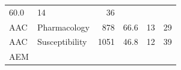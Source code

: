 \documentclass[11pt,]{article}
\begin{document}
\begin{longtable}[]{@{}llrrrr@{}}
\begin{minipage}[t]{0.08\columnwidth}
60.0\strut
\end{minipage} & \begin{minipage}[t]{0.11\columnwidth}\raggedleft\strut
14\strut
\end{minipage} & \begin{minipage}[t]{0.11\columnwidth}\raggedleft\strut
36\strut
\end{minipage}\tabularnewline
\begin{minipage}[t]{0.06\columnwidth}\raggedright\strut
AAC\strut
\end{minipage} & \begin{minipage}[t]{0.43\columnwidth}\raggedright\strut
Pharmacology\strut
\end{minipage} & \begin{minipage}[t]{0.04\columnwidth}\raggedleft\strut
878\strut
\end{minipage} & \begin{minipage}[t]{0.08\columnwidth}\raggedleft\strut
66.6\strut
\end{minipage} & \begin{minipage}[t]{0.11\columnwidth}\raggedleft\strut
13\strut
\end{minipage} & \begin{minipage}[t]{0.11\columnwidth}\raggedleft\strut
29\strut
\end{minipage}\tabularnewline
\begin{minipage}[t]{0.06\columnwidth}\raggedright\strut
AAC\strut
\end{minipage} & \begin{minipage}[t]{0.43\columnwidth}\raggedright\strut
Susceptibility\strut
\end{minipage} & \begin{minipage}[t]{0.04\columnwidth}\raggedleft\strut
1051\strut
\end{minipage} & \begin{minipage}[t]{0.08\columnwidth}\raggedleft\strut
46.8\strut
\end{minipage} & \begin{minipage}[t]{0.11\columnwidth}\raggedleft\strut
12\strut
\end{minipage} & \begin{minipage}[t]{0.11\columnwidth}\raggedleft\strut
39\strut
\end{minipage}\tabularnewline
\begin{minipage}[t]{0.06\columnwidth}\raggedright\strut
AEM\strut
\end{minipage} & \begin{minipage}[t]{0.43\columnwidth}\raggedright\strut

\end{minipage}
\end{longtable}
\end{document}
